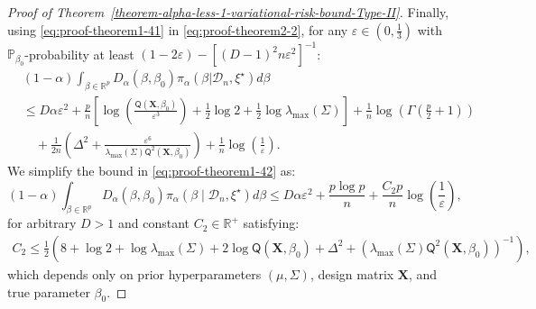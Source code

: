 \documentclass[10pt,a4paper]{amsart}
\begin{document}
\begin{proof}[Proof of Theorem~\ref{theorem-alpha-less-1-variational-risk-bound-Type-II}]
Finally, using \eqref{eq:proof-theorem1-41} in \eqref{eq:proof-theorem2-2}, for any $\varepsilon \in \left(0,\frac{1}{3}\right)$ with $\mathbb{P}_{\beta_0}$-probability at least $(1 - 2\varepsilon) - [(D-1)^2n\varepsilon^2]^{-1}$:
%
\begin{equation}\label{eq:proof-theorem1-42}
\begin{split}
    &(1-\alpha)\int_{\beta\in \mathbb{R}^p} D_{\alpha}(\beta, \beta_0)\pi_{\alpha}(\beta| \mathcal{D}_n, \xi^{\star})d\beta\\
&\leq D\alpha\varepsilon^2 + \frac{p}{n}\left[\log \left(\frac{\mathsf{Q}( \mathbf{X}, \beta_0)}{\varepsilon^3}\right) + \frac{1}{2} \log 2 + \frac{1}{2}\log \lambda_{\max}(\Sigma)\right] + \frac{1}{n}\log \left(\Gamma\left(\frac{p}{2} + 1\right)\right)\\
&\quad + \frac{1}{2n}\left(\Delta^2 + \frac{\varepsilon^6}{\lambda_{\mathrm{max}}(\Sigma)\mathsf{Q}^{2}(\mathbf{X}, \beta_0)}\right) + \frac{1}{n}\log\left(\frac{1}{\varepsilon}\right).
\end{split}
\end{equation}
%
We simplify the bound in \eqref{eq:proof-theorem1-42} as:
%
\begin{equation}\label{eq:proof-theorem1-final-TypeII-bound}
\boxed{(1-\alpha)\int_{\beta\in \mathbb{R}^p} D_{\alpha}(\beta, \beta_0)\pi_{\alpha}(\beta\mid \mathcal{D}_n, \xi^{\star})d\beta \leq D\alpha\varepsilon^2 + \frac{p \log p}{n} + \frac{C_2 p}{n}\log\left(\frac{1}{\varepsilon}\right)},
\end{equation}
%
for arbitrary $D>1$ and constant $C_2\in \mathbb{R}^{+}$ satisfying:
\begin{align}\label{eq:proof-theorem1-bound-constants-type-II}
C_2 \leq \frac{1}{2}\left(8 + \log 2 + \log \lambda_{\max}(\Sigma) + 2\log \mathsf{Q}( \mathbf{X}, \beta_0) + \Delta^2 + \left(\lambda_{\max}(\Sigma)\mathsf{Q}^2(\mathbf{X}, \beta_0)\right)^{-1}\right),
\end{align}
which depends only on prior hyperparameters $(\mu, \Sigma)$, design matrix $\mathbf{X}$, and true parameter $\beta_0$. 
\end{proof}
\end{document}
